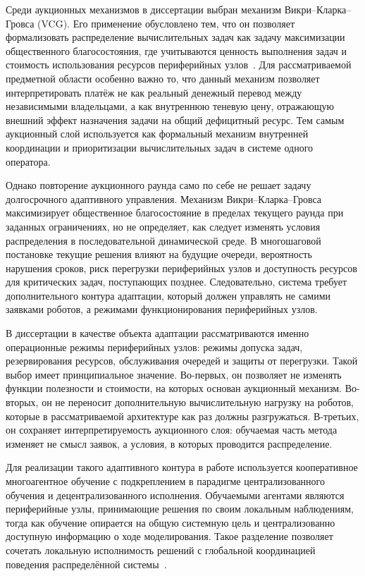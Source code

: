 Среди аукционных механизмов в диссертации выбран механизм Викри--Кларка--Гровса (VCG). Его применение обусловлено тем, что он позволяет формализовать распределение вычислительных задач как задачу максимизации общественного благосостояния, где учитываются ценность выполнения задач и стоимость использования ресурсов периферийных узлов~\cite{Vickrey1961Counterspeculation,Clarke1971MultipartPricing,Groves1973IncentivesTeams}. Для рассматриваемой предметной области особенно важно то, что данный механизм позволяет интерпретировать платёж не как реальный денежный перевод между независимыми владельцами, а как внутреннюю теневую цену, отражающую внешний эффект назначения задачи на общий дефицитный ресурс. Тем самым аукционный слой используется как формальный механизм внутренней координации и приоритизации вычислительных задач в системе одного оператора.

Однако повторение аукционного раунда само по себе не решает задачу долгосрочного адаптивного управления. Механизм Викри--Кларка--Гровса максимизирует общественное благосостояние в пределах текущего раунда при заданных ограничениях, но не определяет, как следует изменять условия распределения в последовательной динамической среде. В многошаговой постановке текущие решения влияют на будущие очереди, вероятность нарушения сроков, риск перегрузки периферийных узлов и доступность ресурсов для критических задач, поступающих позднее. Следовательно, система требует дополнительного контура адаптации, который должен управлять не самими заявками роботов, а режимами функционирования периферийных узлов.

В диссертации в качестве объекта адаптации рассматриваются именно операционные режимы периферийных узлов: режимы допуска задач, резервирования ресурсов, обслуживания очередей и защиты от перегрузки. Такой выбор имеет принципиальное значение. Во-первых, он позволяет не изменять функции полезности и стоимости, на которых основан аукционный механизм. Во-вторых, он не переносит дополнительную вычислительную нагрузку на роботов, которые в рассматриваемой архитектуре как раз должны разгружаться. В-третьих, он сохраняет интерпретируемость аукционного слоя: обучаемая часть метода изменяет не смысл заявок, а условия, в которых проводится распределение.

Для реализации такого адаптивного контура в работе используется кооперативное многоагентное обучение с подкреплением в парадигме централизованного обучения и децентрализованного исполнения. Обучаемыми агентами являются периферийные узлы, принимающие решения по своим локальным наблюдениям, тогда как обучение опирается на общую системную цель и централизованно доступную информацию о ходе моделирования. Такое разделение позволяет сочетать локальную исполнимость решений с глобальной координацией поведения распределённой системы~\cite{Oliehoek2016DecPOMDP,Rashid2018QMIX,Hady2025MARLRAOSurvey}.

